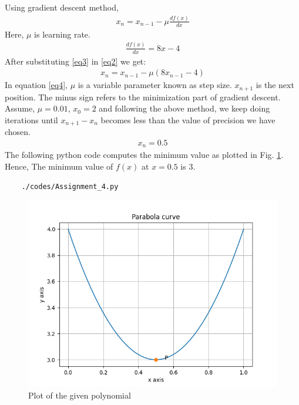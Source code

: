 \documentclass[journal,12pt,twocolumn]{IEEEtran}
\begin{document}
    Using gradient descent method,
    \begin{align}
    x_n=x_{n-1}-\mu\frac{df(x)}{dx} \label{eq2}
    \end{align}
    Here, $\mu$ is learning rate.\\
    \begin{align}
    \frac{df(x)}{dx}=8x-4 \label{eq3}
\end{align}
After substituting \ref{eq3} in \ref{eq2} we get:
\begin{align}
x_n=x_{n-1}-\mu( 8x_{n-1}-4)\label{eq4}
\end{align}
In equation \eqref{eq4}, $\mu$ is a variable parameter known as step size. $x_{n+1}$ is the next position. The minus sign refers to the minimization part of gradient descent. Assume, $\mu=0.01$, $x_0=2$ and following the above method, we keep doing iterations until $x_{n+1}-x_{n}$ becomes less than the value of precision we have chosen.
\begin{align}
    x_n=0.5
\end{align}
The following python code computes the minimum value as plotted in Fig. \ref{fig:5.1}. Hence, The minimum value of $f(x)$ at $x=0.5$ is 3.
	\begin{lstlisting}
	./codes/Assignment_4.py
	\end{lstlisting}
		\begin{figure}[!ht]
	\centering
	\includegraphics[width=\columnwidth]{Figure_1.png}
	\caption{Plot of the given polynomial}
	\label{fig:5.1}	
	\end{figure}
\end{document}
